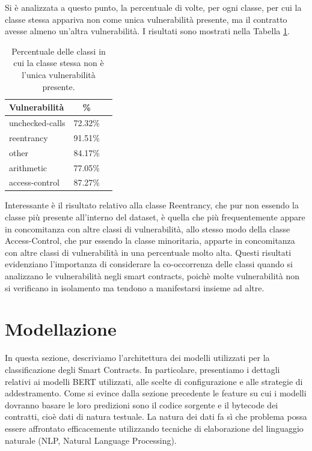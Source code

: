 \documentclass[../../Thesis.tex]{subfiles}
\begin{document}
Si \`e analizzata a questo punto, la percentuale di volte, per ogni classe, per cui la classe stessa appariva non come unica vulnerabilit\`a presente, ma il contratto avesse almeno un'altra vulnerabilit\`a. I risultati sono mostrati nella Tabella \ref{tab:multi_vuln}.

\begin{table}[h!]
    \centering
    \begin{tabular}{|l|c|c|}
        \hline
        \textbf{Vulnerabilit\`a} & \textbf{\%} \\
        \hline
        unchecked-calls  & 72.32\% \\
        reentrancy  & 91.51\% \\
        other  & 84.17\% \\
        arithmetic  & 77.05\% \\
        access-control  & 87.27\% \\

        \hline
    \end{tabular}
    \caption{Percentuale delle classi in cui la classe stessa non \`e l'unica vulnerabilit\`a presente.}
    \label{tab:multi_vuln}
\end{table}
Interessante \`e il risultato relativo alla classe Reentrancy, che pur non essendo la classe pi\`u presente all'interno del dataset, \`e quella che pi\`u frequentemente appare in concomitanza con altre classi di vulnerabilit\`a, allo stesso modo della classe Access-Control, che pur essendo la classe minoritaria, apparte in concomitanza con altre classi di vulnerabilit\`a in una percentuale molto alta.
Questi risultati evidenziano l'importanza di considerare la co-occorrenza delle classi quando si analizzano le vulnerabilit\`a negli smart contracts, poich\`e molte vulnerabilit\`a non si verificano in isolamento ma tendono a manifestarsi insieme ad altre.


\section{Modellazione}
In questa sezione, descriviamo l'architettura dei modelli utilizzati per la classificazione degli Smart Contracts. In particolare, presentiamo i dettagli relativi ai modelli BERT utilizzati, alle scelte di configurazione e alle strategie di addestramento.
Come si evince dalla sezione precedente le feature su cui i modelli dovranno basare le loro predizioni sono il codice sorgente e il bytecode dei contratti, cio\`e dati di natura testuale. La natura dei dati fa s\`i che problema possa essere affrontato efficacemente utilizzando tecniche di elaborazione del linguaggio naturale (NLP, Natural Language Processing).
\end{document}
